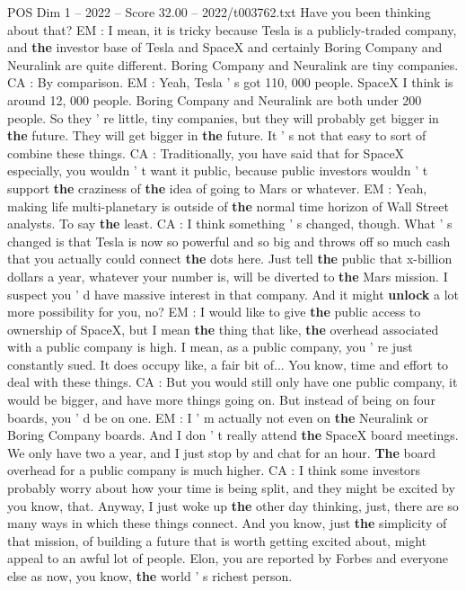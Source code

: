 \begin{textsample}{POS Dim 1 – 2022 – Score 32.00 – 2022/t003762.txt}
Have you been thinking about that?
EM : I mean, it is tricky because Tesla is a publicly-traded company, and \textbf{the} investor base of Tesla and SpaceX and certainly Boring Company and Neuralink are quite different.
Boring Company and Neuralink are tiny companies.
CA : By comparison.
EM : Yeah, Tesla ' s got 110, 000 people.
SpaceX I think is around 12, 000 people.
Boring Company and Neuralink are both under 200 people.
So they ' re little, tiny companies, but they will probably get bigger in \textbf{the} future.
They will get bigger in \textbf{the} future.
It ' s not that easy to sort of combine these things.
CA : Traditionally, you have said that for SpaceX especially, you wouldn ' t want it public, because public investors wouldn ' t support \textbf{the} craziness of \textbf{the} idea of going to Mars or whatever.
EM : Yeah, making life multi-planetary is outside of \textbf{the} normal time horizon of Wall Street analysts.
To say \textbf{the} least.
CA : I think something ' s changed, though.
What ' s changed is that Tesla is now so powerful and so big and throws off so much cash that you actually could connect \textbf{the} dots here.
Just tell \textbf{the} public that x-billion dollars a year, whatever your number is, will be diverted to \textbf{the} Mars mission.
I suspect you ' d have massive interest in that company.
And it might \textbf{unlock} a lot more possibility for you, no?
EM : I would like to give \textbf{the} public access to ownership of SpaceX, but I mean \textbf{the} thing that like, \textbf{the} overhead associated with a public company is high.
I mean, as a public company, you ' re just constantly sued.
It does occupy like, a fair bit of...
You know, time and effort to deal with these things.
CA : But you would still only have one public company, it would be bigger, and have more things going on.
But instead of being on four boards, you ' d be on one.
EM : I ' m actually not even on \textbf{the} Neuralink or Boring Company boards.
And I don ' t really attend \textbf{the} SpaceX board meetings.
We only have two a year, and I just stop by and chat for an hour. \textbf{The} board overhead for a public company is much higher.
CA : I think some investors probably worry about how your time is being split, and they might be excited by you know, that.
Anyway, I just woke up \textbf{the} other day thinking, just, there are so many ways in which these things connect.
And you know, just \textbf{the} simplicity of that mission, of building a future that is worth getting excited about, might appeal to an awful lot of people.
Elon, you are reported by Forbes and everyone else as now, you know, \textbf{the} world ' s richest person.

\end{textsample}
